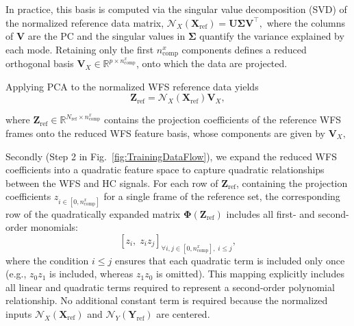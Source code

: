 In practice, this basis is computed via the singular value decomposition (SVD) of the normalized reference data matrix,
\(
\mathcal{N}_X(\mathbf{X}_{\mathrm{ref}})
=
\mathbf{U}\mathbf{\Sigma}\mathbf{V}^\top,
\)
where the columns of \(\mathbf{V}\) are the PC and the singular values in \(\mathbf{\Sigma}\) quantify the variance explained by each mode. Retaining only the first \(n_{\mathrm{comp}}^x\) components defines a reduced orthogonal basis
\(
\mathbf{V}_X \in \mathbb{R}^{p \times n_{\mathrm{comp}}^x}
\),
onto which the data are projected.

Applying PCA to the normalized WFS reference data yields
\begin{equation}
\mathbf{Z}_{\mathrm{ref}}
=
\mathcal{N}_X(\mathbf{X}_{\mathrm{ref}})
\mathbf{V}_X,
\end{equation}

where 
\(
\mathbf{Z}_{\mathrm{ref}} \in \mathbb{R}^{N_{\mathrm{ref}} \times n_{\mathrm{comp}}^x}
\) contains the projection coefficients of the reference WFS frames onto the reduced WFS feature basis, whose components are given by $\mathbf{V}_X,$




Secondly (Step 2 in Fig.~\ref{fig:TrainingDataFlow}), we expand the reduced WFS coefficients into a quadratic feature space to capture quadratic relationships between the WFS and HC signals. For each row of $\mathbf{Z}_{\mathrm{ref}}$, containing the projection coefficients $z_{i \in [0, n_{\mathrm{comp}}^x]}$ for a single frame of the reference set, the corresponding row of the quadratically expanded matrix $\mathbf{\Phi}(\mathbf{Z}_{\mathrm{ref}})$ includes all first- and second-order monomials:
\begin{equation}
\left[
z_i,\;
z_i z_j
\right]_{\forall i,j \in [0, n_{\mathrm{comp}}^x],\; i \le j},
\end{equation}
where the condition $i \leq j$ ensures that each quadratic term is included only once (e.g., $z_0z_1$ is included, whereas $z_1z_0$ is omitted). This mapping explicitly includes all linear and quadratic terms required to represent a second-order polynomial relationship. No additional constant term is required because the normalized inputs $\mathcal{N}_X(\mathbf{X}_{\mathrm{ref}})$ and $\mathcal{N}_Y(\mathbf{Y}_{\mathrm{ref}})$ are centered.

